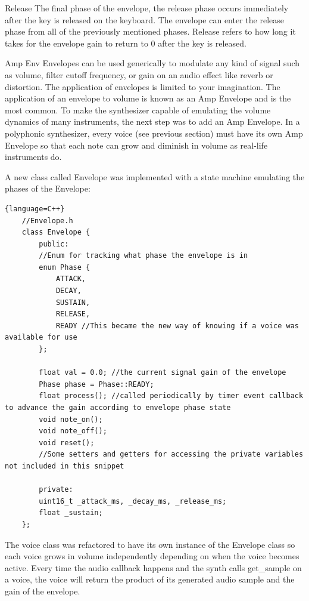 \documentclass[acmlarge,screen]{acmart}
\begin{document}
	Release
	The final phase of the envelope, the release phase occurs immediately after the key is released on the keyboard. The envelope can enter the release phase from all of the previously mentioned phases. Release refers to how long it takes for the envelope gain to return to 0 after the key is released.
	
	Amp Env
	Envelopes can be used generically to modulate any kind of signal such as volume, filter cutoff frequency, or gain on an audio effect like reverb or distortion. The application of envelopes is limited to your imagination. The application of an envelope to volume is known as an Amp Envelope and is the most common. To make the synthesizer capable of emulating the volume dynamics of many instruments, the next step was to add an Amp Envelope. In a polyphonic synthesizer, every voice (see previous section) must have its own Amp Envelope so that each note can grow and diminish in volume as real-life instruments do.
	
	A new class called Envelope was implemented with a state machine emulating the phases of the Envelope:
	
	\begin{lstlisting}{language=C++}
	//Envelope.h
	class Envelope {
		public:
		//Enum for tracking what phase the envelope is in
		enum Phase {
			ATTACK,
			DECAY,
			SUSTAIN,
			RELEASE,
			READY //This became the new way of knowing if a voice was available for use
		};
		
		float val = 0.0; //the current signal gain of the envelope
		Phase phase = Phase::READY;
		float process(); //called periodically by timer event callback to advance the gain according to envelope phase state
		void note_on();
		void note_off();
		void reset();
		//Some setters and getters for accessing the private variables not included in this snippet
		
		private:
		uint16_t _attack_ms, _decay_ms, _release_ms;
		float _sustain;
	};
	\end{lstlisting}
	
	The voice class was refactored to have its own instance of the Envelope class so each voice grows in volume independently depending on when the voice becomes active. Every time the audio callback happens and the synth calls get\_sample on a voice, the voice will return the product of its generated audio sample and the gain of the envelope.
	
\end{document}
